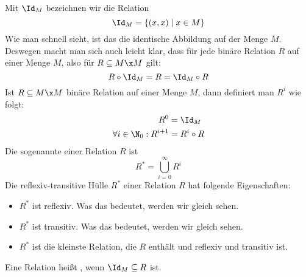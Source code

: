 Mit $\Id_M$ bezeichnen wir die Relation
\[
\Id_M = \{ (x,x) \mid x\in M \}
\]
Wie man schnell sieht, ist das die identische Abbildung auf der Menge
$M$.  Deswegen macht man sich auch leicht klar, dass für jede binäre
Relation $R$ auf einer Menge $M$, also für $R\subseteq M\x M$ gilt:
\[
R \circ \Id_M = R = \Id_M \circ R
\]
%
Ist $R\subseteq M\x M$ binäre Relation auf einer Menge $M$, dann
definiert man  $R^i$ wie folgt:
%
\begin{align*}
  R^0 &= \Id_M \\
  \forall i\in \N_0: R^{i+1} &= R^i \circ R \\  
\end{align*}
%
Die sogenannte  einer Relation $R$ ist
\[
R^* = \bigcup_{i=0}^{\infty} R^i
\]
Die reflexiv-transitive Hülle $R^*$ einer Relation $R$ hat folgende
Eigenschaften:
\begin{itemize}
\item $R^*$ ist reflexiv. Was das bedeutet, werden wir gleich sehen.
\item $R^*$ ist transitiv. Was das bedeutet, werden wir gleich sehen.
\item $R^*$ ist die kleinste Relation, die $R$ enthält und reflexiv
  und transitiv ist.
\end{itemize}
%
Eine Relation heißt , wenn $\Id_M\subseteq R$ ist.

